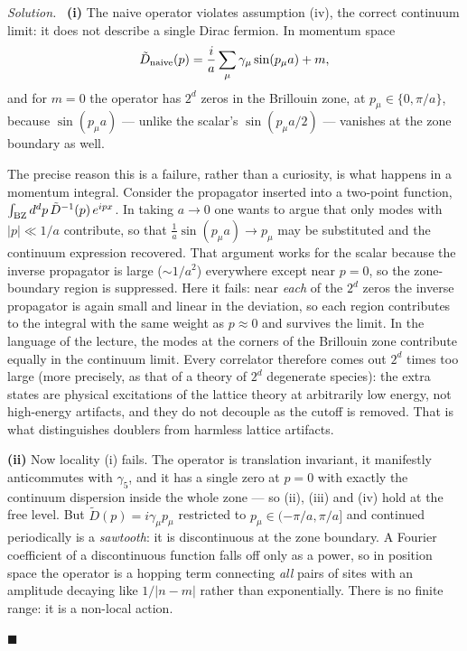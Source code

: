 \documentclass[11pt]{article}
\newenvironment{solution}{\par\smallskip\noindent\textit{Solution.}\ }{\hfill$\blacksquare$\par\smallskip}
\begin{document}
\begin{solution}
\textbf{(i)} The naive operator violates assumption (iv), the correct continuum limit: it does not describe a single Dirac fermion. In momentum space
\begin{equation}
\tilde D_{\rm naive}(p) = \frac{i}{a}\sum_\mu \gamma_\mu \sin(p_\mu a) + m,
\end{equation}
and for $m=0$ the operator has $2^d$ zeros in the Brillouin zone, at $p_\mu \in \{0,\pi/a\}$, because $\sin(p_\mu a)$ --- unlike the scalar's $\sin(p_\mu a/2)$ --- vanishes at the zone boundary as well.

The precise reason this is a failure, rather than a curiosity, is what happens in a momentum integral. Consider the propagator inserted into a two-point function, $\int_{\rm BZ} d^dp\, \tilde D^{-1}(p)\,e^{ipx}$. In taking $a\to0$ one wants to argue that only modes with $|p| \ll 1/a$ contribute, so that $\frac{1}{a}\sin(p_\mu a) \to p_\mu$ may be substituted and the continuum expression recovered. That argument works for the scalar because the inverse propagator is large ($\sim 1/a^2$) everywhere except near $p=0$, so the zone-boundary region is suppressed. Here it fails: near \emph{each} of the $2^d$ zeros the inverse propagator is again small and linear in the deviation, so each region contributes to the integral with the same weight as $p\approx0$ and survives the limit. In the language of the lecture, the modes at the corners of the Brillouin zone contribute equally in the continuum limit. Every correlator therefore comes out $2^d$ times too large (more precisely, as that of a theory of $2^d$ degenerate species): the extra states are physical excitations of the lattice theory at arbitrarily low energy, not high-energy artifacts, and they do not decouple as the cutoff is removed. That is what distinguishes doublers from harmless lattice artifacts.

\textbf{(ii)} Now locality (i) fails. The operator is translation invariant, it manifestly anticommutes with $\gamma_5$, and it has a single zero at $p=0$ with exactly the continuum dispersion inside the whole zone --- so (ii), (iii) and (iv) hold at the free level. But $\tilde D(p) = i\gamma_\mu p_\mu$ restricted to $p_\mu\in(-\pi/a,\pi/a]$ and continued periodically is a \emph{sawtooth}: it is discontinuous at the zone boundary. A Fourier coefficient of a discontinuous function falls off only as a power, so in position space the operator is a hopping term connecting \emph{all} pairs of sites with an amplitude decaying like $1/|n-m|$ rather than exponentially. There is no finite range: it is a non-local action.


\end{solution}
\end{document}
